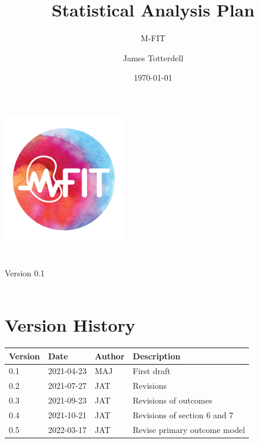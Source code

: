 \documentclass[11pt,parskip=half-]{scrartcl}
\renewcommand{\arraystretch}{0.5}
\begin{document}
\title{Statistical Analysis Plan}
\subtitle{M-FIT}
\author{James Totterdell}
\date{\today}
\makeatletter
\begin{titlepage}
  \begin{center}
    \includegraphics[width=0.7\linewidth, height=0.4\linewidth, keepaspectratio]{mfit-logo.png}\\[4ex]
    {\huge \bfseries  \@title }\\[2ex]
    {\LARGE \bfseries  \@subtitle }\\[2ex]
    {\large Version 0.1}\\[2ex]
    {\large \@date}\\[10ex]
  \end{center}
\end{titlepage}
\makeatother
\thispagestyle{empty}
\newpage

\tableofcontents

\section*{Version History}
\label{version-history}


\begin{table}[H]
  \renewcommand{\arraystretch}{1}
  \begin{center}
    \begin{tabular}{lllp{5cm}}
      \hline
      Version & Date       & Author & Description                  \\ \hline
      0.1     & 2021-04-23 & MAJ    & First draft                  \\
      0.2     & 2021-07-27 & JAT    & Revisions                    \\
      0.3     & 2021-09-23 & JAT    & Revisions of outcomes        \\
      0.4     & 2021-10-21 & JAT    & Revisions of section 6 and 7 \\
      0.5     & 2022-03-17 & JAT    & Revise primary outcome model \\
      \hline
    \end{tabular}
  \end{center}
\end{table}
\end{document}
